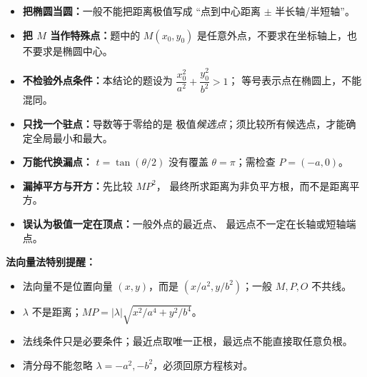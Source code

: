 \begin{trapbox}
\begin{itemize}
  \item \textbf{把椭圆当圆：}一般不能把距离极值写成
  “点到中心距离 $\pm$ 半长轴/半短轴”。
  \item \textbf{把 $M$ 当作特殊点：}题中的 $M(x_0,y_0)$
  是任意外点，不要求在坐标轴上，也不要求是椭圆中心。
  \item \textbf{不检验外点条件：}本结论的题设为
  $\dfrac{x_0^2}{a^2}+\dfrac{y_0^2}{b^2}>1$；
  等号表示点在椭圆上，不能混同。
  \item \textbf{只找一个驻点：}导数等于零给的是
  极值\emph{候选点}；须比较所有候选点，才能确定全局最小和最大。
  \item \textbf{万能代换漏点：} $t=\tan(\theta/2)$
  没有覆盖 $\theta=\pi$；需检查 $P=(-a,0)$。
  \item \textbf{漏掉平方与开方：}先比较 $MP^2$，
  最终所求距离为非负平方根，而不是距离平方。
  \item \textbf{误认为极值一定在顶点：}一般外点的最近点、
  最远点不一定在长轴或短轴端点。
\end{itemize}

\medskip\textbf{法向量法特别提醒：}
\begin{itemize}
\item 法向量不是位置向量 $(x,y)$，而是 $(x/a^2,y/b^2)$；一般 $M,P,O$ 不共线。
\item $\lambda$ 不是距离；$MP=|\lambda|\sqrt{x^2/a^4+y^2/b^4}$。
\item 法线条件只是必要条件；最近点取唯一正根，最远点不能直接取任意负根。
\item 清分母不能忽略 $\lambda=-a^2,-b^2$，必须回原方程核对。
\end{itemize}


\end{trapbox}
